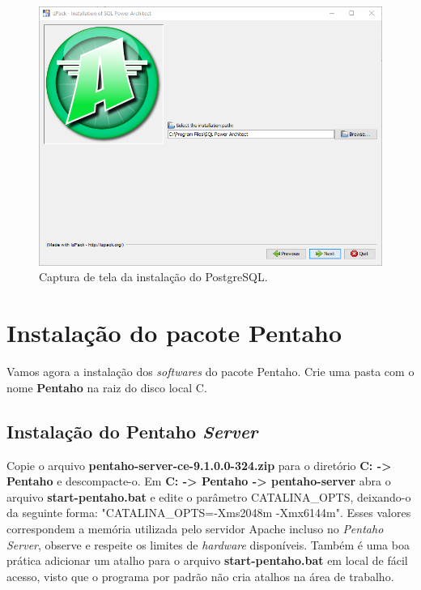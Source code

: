 \begin{apendicesenv}
\begin{figure}[htb]
	\caption{\label{apend_sqlpower}Captura de tela da instalação do PostgreSQL.}
	\begin{center}
	    \includegraphics[scale=0.6]{Imagens/apendice instalacaopowersql.png}
	\end{center}
\end{figure}

\section{Instalação do pacote Pentaho}
Vamos agora a instalação dos \textit{softwares} do pacote Pentaho. Crie uma pasta com o nome \textbf{Pentaho} na raiz do disco local C.

\subsection{Instalação do Pentaho \textit{Server}}
Copie o arquivo \textbf{pentaho-server-ce-9.1.0.0-324.zip} para o diretório \textbf{C: -> Pentaho} e descompacte-o. Em \textbf{C: -> Pentaho -> pentaho-server} abra o arquivo \textbf{start-pentaho.bat} e edite o parâmetro CATALINA\_OPTS, deixando-o da seguinte forma: "CATALINA\_OPTS=-Xms2048m -Xmx6144m". Esses valores correspondem a memória utilizada pelo servidor Apache incluso no \textit{Pentaho Server}, observe e respeite os limites de \textit{hardware} disponíveis. Também é uma boa prática adicionar um atalho para o arquivo \textbf{start-pentaho.bat} em local de fácil acesso, visto que o programa por padrão não cria atalhos na área de trabalho.


\end{apendicesenv}

